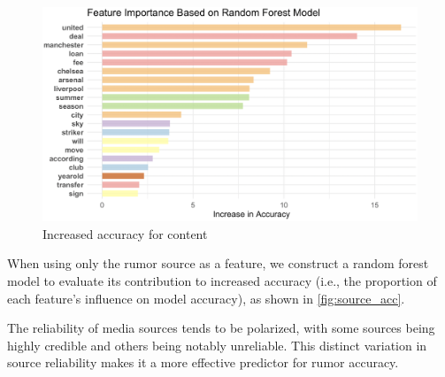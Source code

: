 

\begin{figure}[ht]
    \centering
    \includegraphics[width=.8\textwidth]{figs/cont_acc.png}
    \caption{
       Increased accuracy for content
    }\label{fig:cont_acc}
\end{figure}

When using only the rumor source as a feature, we construct a random forest model to evaluate its contribution to increased accuracy (i.e., the proportion of each feature's influence on model accuracy), as shown in \autoref{fig:source_acc}.

The reliability of media sources tends to be polarized, with some sources being highly credible and others being notably unreliable. This distinct variation in source reliability makes it a more effective predictor for rumor accuracy.


